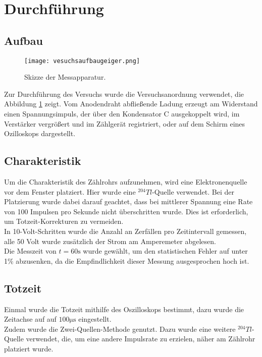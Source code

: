 \section{Durchführung}
\label{sec:Durchführung}

\subsection{Aufbau}
\begin{figure}
 \centering
 \caption{Skizze der Messapparatur.}
 \texttt{[image: vesuchsaufbaugeiger.png]}
 \label{fig:aufbauversuch}
\end{figure}

\noindent Zur Durchführung des Versuchs wurde die Versuchsanordnung verwendet,
die Abbildung \ref{fig:aufbauversuch} zeigt. Vom Anodendraht abfließende Ladung
erzeugt am Widerstand einen Spannungsimpuls, der über den Kondensator C ausgekoppelt wird,
im Verstärker vergrößert und im Zählgerät registriert, oder auf dem Schirm
eines Ozilloskops dargestellt.\\

\subsection{Charakteristik}
Um die Charakteristik des Zählrohrs aufzunehmen, wird eine Elektronenquelle vor dem
Fenster platziert. Hier wurde eine $^204Tl$-Quelle verwendet. Bei der Platzierung
wurde dabei darauf geachtet, dass bei mittlerer Spannung eine Rate von
100 Impulsen pro Sekunde nicht überschritten wurde. Dies ist erforderlich,
um Totzeit-Korrekturen zu vermeiden. \\
In 10-Volt-Schritten wurde die Anzahl an Zerfällen pro Zeitintervall gemessen, alle 
50 Volt wurde zusätzlich der Strom am Amperemeter abgelesen.\\
Die Messzeit von $t = 60\si{\s}$ wurde gewählt, um den statistischen Fehler
auf unter 1\% abzusenken, da die Empfindlichkeit dieser Messung ausgesprochen
hoch ist. 

\subsection{Totzeit}
Einmal wurde die Totzeit mithilfe des Oszilloskops bestimmt, dazu wurde 
die Zeitachse auf auf $100 \si{\micro\s}$ eingestellt.\\
Zudem wurde die Zwei-Quellen-Methode genutzt. Dazu wurde eine weitere
$^204 Tl$-Quelle verwendet, die, um eine andere Impulsrate zu erzielen,
näher am Zählrohr platziert wurde. 

